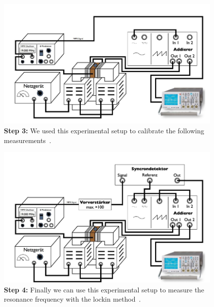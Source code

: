 \begin{figure}[htpb]
    \centering
    \includegraphics[width=0.8\linewidth]{figures/setup3}
    \caption{\textbf{Step 3:}
        We used this experimental setup to calibrate the following
        measurements~\cite{versuchsanleitung}.}
    \label{fig:figures/setup1}
\end{figure}
\begin{figure}[htpb]
    \centering
    \includegraphics[width=0.8\linewidth]{figures/setup4}
    \caption{\textbf{Step 4:}
        Finally we can use this experimental setup to measure
        the resonance frequency with the lockin method~\cite{versuchsanleitung}.}

    \label{fig:figures/setup1}
\end{figure}
\clearpage




